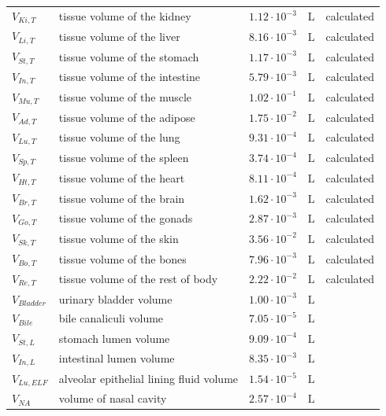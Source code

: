 \documentclass[preprint,12pt,authoryear]{elsarticle}
\begin{document}
\begin{longtable}{P{2cm}P{3.5cm}P{2cm}P{1cm}P{2.5cm}}
$V_{Ki,T}$ & tissue volume of the kidney & $1.12 \cdot 10^{-3}$ & $\text{L}$ & calculated \\
$V_{Li,T}$ & tissue volume of the liver & $8.16 \cdot 10^{-3}$ & $\text{L}$ & calculated \\
$V_{St,T}$ & tissue volume of the stomach & $1.17 \cdot 10^{-3}$ & $\text{L}$ & calculated \\
$V_{In,T}$ & tissue volume of the intestine & $5.79 \cdot 10^{-3}$ & $\text{L}$ & calculated \\
$V_{Mu,T}$ & tissue volume of the muscle & $1.02 \cdot 10^{-1}$ & $\text{L}$ & calculated \\
$V_{Ad,T}$ & tissue volume of the adipose & $1.75 \cdot 10^{-2}$ & $\text{L}$ & calculated \\
$V_{Lu,T}$ & tissue volume of the lung & $9.31 \cdot 10^{-4}$ & $\text{L}$ & calculated \\
$V_{Sp,T}$ & tissue volume of the spleen & $3.74 \cdot 10^{-4}$ & $\text{L}$ & calculated \\
$V_{Ht,T}$ & tissue volume of the heart & $8.11 \cdot 10^{-4}$ & $\text{L}$ & calculated \\
$V_{Br,T}$ & tissue volume of the brain & $1.62 \cdot 10^{-3}$ & $\text{L}$ & calculated \\
$V_{Go,T}$ & tissue volume of the gonads & $2.87 \cdot 10^{-3}$ & $\text{L}$ & calculated \\
$V_{Sk,T}$ & tissue volume of the skin & $3.56 \cdot 10^{-2}$ & $\text{L}$ & calculated \\
$V_{Bo,T}$ & tissue volume of the bones & $7.96 \cdot 10^{-3}$ & $\text{L}$ & calculated \\
$V_{Re,T}$ & tissue volume of the rest of body & $2.22 \cdot 10^{-2}$ & $\text{L}$ & calculated \\\midrule\midrule


$V_{Bladder}$ & urinary bladder volume & $1.00 \cdot 10^{-3}$ & $\text{L}$ & \citep{andersson_2004} \\
$V_{Bile}$ & bile canaliculi volume & $7.05 \cdot 10^{-5}$ & $\text{L}$ & \citep{masyuk_2001} \\
$V_{St,L}$ & stomach lumen volume & $9.09 \cdot 10^{-4}$ & $\text{L}$ & \citep{mcconnell_2008} \\
$V_{In,L}$ & intestinal lumen volume & $8.35 \cdot 10^{-3}$ & $\text{L}$ & \citep{mcconnell_2008} \\
$V_{Lu,ELF}$ & alveolar epithelial lining fluid volume & $1.54 \cdot 10^{-5}$ & $\text{L}$ & \citep{boger_2023} \\
$V_{NA}$ & volume of nasal cavity & $2.57 \cdot 10^{-4}$ & $\text{L}$ & \citep{gross_1982} \\


\end{longtable}
\end{document}
